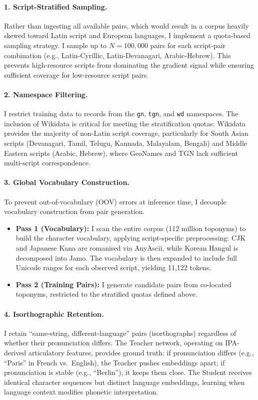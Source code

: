 \documentclass[11pt,a4paper]{article}
\begin{document}
\paragraph{1. Script-Stratified Sampling.}
Rather than ingesting all available pairs, which would result in a corpus heavily skewed toward Latin script and European languages, I implement a quota-based sampling strategy. I sample up to $N=100,000$ pairs for each script-pair combination (e.g., Latin-Cyrillic, Latin-Devanagari, Arabic-Hebrew). This prevents high-resource scripts from dominating the gradient signal while ensuring sufficient coverage for low-resource script pairs.

\paragraph{2. Namespace Filtering.}
I restrict training data to records from the \texttt{gn}, \texttt{tgn}, and \texttt{wd} namespaces. The inclusion of Wikidata is critical for meeting the stratification quotas: Wikidata provides the majority of non-Latin script coverage, particularly for South Asian scripts (Devanagari, Tamil, Telugu, Kannada, Malayalam, Bengali) and Middle Eastern scripts (Arabic, Hebrew), where GeoNames and TGN lack sufficient multi-script correspondence.

\paragraph{3. Global Vocabulary Construction.}
To prevent out-of-vocabulary (OOV) errors at inference time, I decouple vocabulary construction from pair generation.
\begin{itemize}
    \item \textbf{Pass 1 (Vocabulary):} I scan the entire corpus (112 million toponyms) to build the character vocabulary, applying script-specific preprocessing: CJK and Japanese Kana are romanised via AnyAscii, while Korean Hangul is decomposed into Jamo. The vocabulary is then expanded to include full Unicode ranges for each observed script, yielding 11,122 tokens.
    \item \textbf{Pass 2 (Training Pairs):} I generate candidate pairs from co-located toponyms, restricted to the stratified quotas defined above.
\end{itemize}

\paragraph{4. Isorthographic Retention.}
I retain ``same-string, different-language'' pairs (isorthographs) regardless of whether their pronunciation differs. The Teacher network, operating on IPA-derived articulatory features, provides ground truth: if pronunciation differs (e.g., ``Paris'' in French vs.\ English), the Teacher pushes embeddings apart; if pronunciation is stable (e.g., ``Berlin''), it keeps them close. The Student receives identical character sequences but distinct language embeddings, learning when language context modifies phonetic interpretation.
\end{document}
